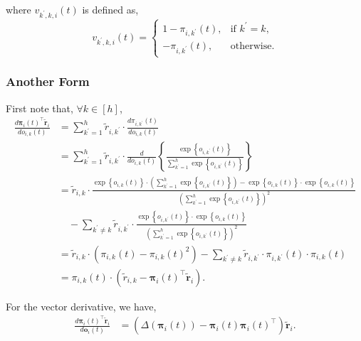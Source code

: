 \documentclass[10pt]{article}
\def\rvo{{\mathbf{o}}}
\def\rvo{{\mathbf{o}}}
\def\rvtilder{{\tilde{\mathbf{r}}}}
\def\rvpi{{\boldsymbol{\pi}}}
\begin{document}
where $v_{k^\prime,k,i}(t)$ is defined as,
\begin{equation*}
	v_{k^\prime,k,i}(t) = \begin{cases}
    1 - \pi_{i,k^\prime}(t), & \text{if $k^\prime = k$}, \\
    - \pi_{i,k^\prime}(t), & \text{otherwise}.
  \end{cases}
\end{equation*}

\subsubsection{Another Form}

First note that, $\forall k \in [h]$,
\begin{equation*}
\begin{split}
    \frac{d \rvpi_i(t)^\top \rvtilder_i}{d o_{i,k}(t)} &= \sum\limits_{k^\prime = 1}^{h}{ \tilde{r}_{i, k^\prime} \cdot \frac{d \pi_{i,k^\prime}(t) }{d o_{i,k}(t)}} \\
    &= \sum\limits_{k^\prime = 1}^{h}{ \tilde{r}_{i, k^\prime} \cdot \frac{d }{d o_{i,k}(t)}} \left\{ \frac{\exp\left\{ o_{i,k^\prime}(t) \right\}}{\sum\limits_{k^\prime = 1}^{h}{\exp\left\{ o_{i,k^\prime}(t) \right\}}} \right\} \\
    &= \tilde{r}_{i, k} \cdot \frac{ \exp\left\{ o_{i,k}(t) \right\} \cdot \left( \sum\limits_{k^\prime = 1}^{h}{\exp\left\{ o_{i,k^\prime}(t) \right\}} \right) - \exp\left\{ o_{i,k}(t) \right\} \cdot \exp\left\{ o_{i,k}(t) \right\} }{ \left( \sum\limits_{k^\prime = 1}^{h}{\exp\left\{ o_{i,k^\prime}(t) \right\}} \right)^2 } \\
    &\quad - \sum\limits_{k^\prime \not= k}{ \tilde{r}_{i, k^\prime} \cdot \frac{\exp\left\{ o_{i,k^\prime}(t) \right\} \cdot \exp\left\{ o_{i,k}(t) \right\} }{ \left( \sum\limits_{k^\prime = 1}^{h}{\exp\left\{ o_{i,k^\prime}(t) \right\}} \right)^2 }} \\
    &= \tilde{r}_{i, k} \cdot \left( \pi_{i,k}(t) - \pi_{i,k}(t)^2 \right) - \sum\limits_{k^\prime \not= k}{ \tilde{r}_{i, k^\prime} \cdot \pi_{i,k^\prime}(t) \cdot \pi_{i,k}(t) } \\
    &= \pi_{i,k}(t) \cdot \left( \tilde{r}_{i, k} - \rvpi_i(t)^\top \rvtilder_i \right).
\end{split}
\end{equation*}

\noindent For the vector derivative, we have,
\begin{equation*}
\begin{split}
    \frac{d \rvpi_i(t)^\top \rvtilder_i}{d \rvo_{i}(t)} &= \left( \Delta\left( \rvpi_i(t) \right) - \rvpi_i(t) \rvpi_i(t)^\top \right) \rvtilder_i .
\end{split}
\end{equation*}
\end{document}
